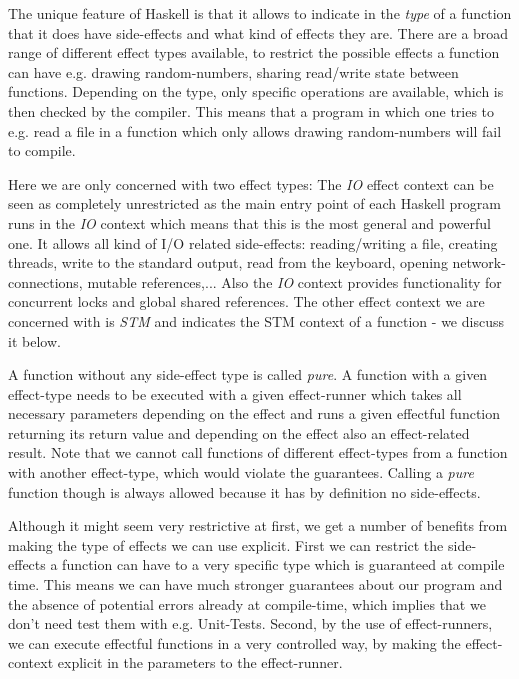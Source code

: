 The unique feature of Haskell is that it allows to indicate in the \textit{type} of a function that it does have side-effects and what kind of effects they are. There are a broad range of different effect types available, to restrict the possible effects a function can have e.g. drawing random-numbers, sharing read/write state between functions. Depending on the type, only specific operations are available, which is then checked by the compiler. This means that a program in which one tries to e.g. read a file in a function which only allows drawing random-numbers will fail to compile.

Here we are only concerned with two effect types: The \textit{IO} effect context can be seen as completely unrestricted as the main entry point of each Haskell program runs in the \textit{IO} context which means that this is the most general and powerful one. It allows all kind of I/O related side-effects: reading/writing a file, creating threads, write to the standard output, read from the keyboard, opening network-connections, mutable references,... Also the \textit{IO} context provides functionality for concurrent locks and global shared references. The other effect context we are concerned with is \textit{STM} and indicates the STM context of a function - we discuss it below. 

A function without any side-effect type is called \textit{pure}. A function with a given effect-type needs to be executed with a given effect-runner which takes all necessary parameters depending on the effect and runs a given effectful function returning its return value and depending on the effect also an effect-related result. Note that we cannot call functions of different effect-types from a function with another effect-type, which would violate the guarantees. Calling a \textit{pure} function though is always allowed because it has by definition no side-effects. 

Although it might seem very restrictive at first, we get a number of benefits from making the type of effects we can use explicit. First we can restrict the side-effects a function can have to a very specific type which is guaranteed at compile time. This means we can have much stronger guarantees about our program and the absence of potential errors already at compile-time, which implies that we don't need test them with e.g. Unit-Tests. Second, by the use of effect-runners, we can execute effectful functions in a very controlled way, by making the effect-context explicit in the parameters to the effect-runner.

